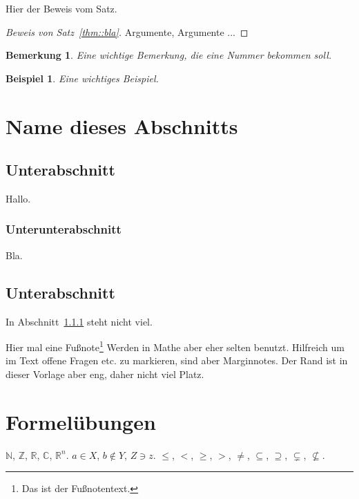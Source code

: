 \documentclass[a4paper,11pt]{article}
\newcommand{\red}{\color{red}}
\newcommand{\N}{{\mathbb N}}
\newcommand{\Z}{{\mathbb Z}}
\newcommand{\R}{{\mathbb R}}
\newcommand{\C}{{\mathbb C}}
\theoremstyle{definition}
\theoremstyle{plain}
\newtheorem{remark}[equation]{Bemerkung}
\newtheorem{example}[equation]{Beispiel}
\begin{document}
Hier der Beweis vom Satz.

\begin{proof}[Beweis von Satz~\ref{thm::bla}]
  Argumente, Argumente ...
\end{proof}


\begin{remark}
   Eine wichtige Bemerkung, die eine Nummer bekommen soll.
\end{remark}

\begin{example}
   Eine wichtiges Beispiel.
\end{example}


\section{Name dieses Abschnitts}
\label{sectionz}

\subsection{Unterabschnitt}

Hallo.

\subsubsection{Unterunterabschnitt}
\label{subsubsectionx}

Bla. 

\subsection{Unterabschnitt}

In Abschnitt~\ref{subsubsectionx} steht nicht viel.

\bigskip

\cbstart \marginnote{\red Unklar!}
Hier mal eine Fußnote\footnote{Das ist der Fußnotentext.} Werden in
Mathe aber eher selten benutzt. Hilfreich um im Text offene Fragen
etc. zu markieren, sind aber Marginnotes.  
Der Rand ist in dieser Vorlage aber eng, daher nicht viel Platz.
\cbend

\section{Formelübungen}
\label{sectionu}

$\N$, $\Z$, $\R$, $\C$, $\R^n$. $a \in X$, $b \not\in Y$, $Z \ni
z$.
$\leq$, $<$, $\geq$, $>$, $\neq$, $\subseteq$, $\supseteq$,
$\subsetneq$, $\not\subseteq$.
\end{document}
